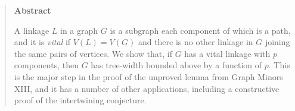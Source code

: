 \origpage{}{}
\begin{quote}
{\centering\textbf{Abstract}\par}

A linkage $L$ in a graph $G$ is a subgraph each component of which is a path, and it is \textit{vital} if $V(L) = V(G)$ and there is no other linkage in $G$ joining the same pairs of vertices. We show that, if $G$ has a vital linkage with $p$ components, then $G$ has tree-width bounded above by a function of $p$. This is the major step in the proof of the unproved lemma from Graph Minors XIII, and it has a number of other applications, including a constructive proof of the intertwining conjecture.
\end{quote}
\clearpage
